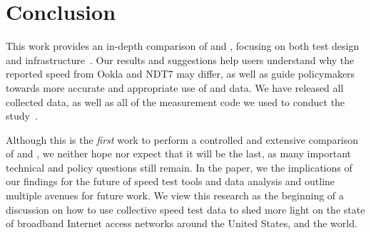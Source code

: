 \section{Conclusion}\label{sec:conclusion}

This work provides an in-depth comparison of \ookla and \ndt, focusing on both
test design and infrastructure~\cite{macmillan2023comparative}. Our results and
suggestions help users understand why the reported speed from Ookla and NDT7 may
differ, as well as guide policymakers towards more accurate and appropriate use
of \ookla and \ndt data.  We have released all collected data, as well as all of
the measurement code we used to conduct the
study~\cite{netrics-code,netrics-data}. 

Although this is the {\em first} work to perform a controlled and extensive
comparison of \ookla and \ndt, we neither hope nor expect that it will be the
last, as many important technical and policy questions still remain. In the
paper, we the implications of our findings for the future of speed test tools
and data analysis and outline multiple avenues for future work. We view this
research as the beginning of a discussion on how to use collective speed test
data to shed more light on the state of broadband Internet access networks
around the United States, and the world.



